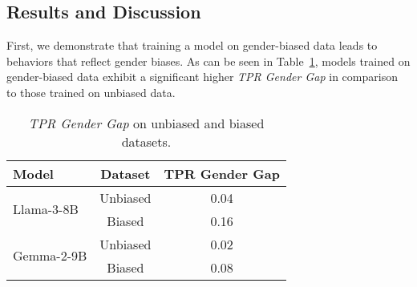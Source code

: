 \documentclass[11pt]{article}
\begin{document}
\subsection{Results and Discussion}

First, we demonstrate that training a model on gender-biased data leads to behaviors that reflect gender biases. As can be seen in Table~\ref{tab:gender_gap}, models trained on gender-biased data exhibit a significant higher \textit{TPR Gender Gap} in comparison to those trained on unbiased data. 

\begin{table}[ht]
\small
\centering
\caption{\textit{TPR Gender Gap} on unbiased and biased datasets.}
\begin{tabular}{lcc}
\toprule
Model  & Dataset  & TPR Gender Gap \\ 
\midrule
\multirow{2}{*}{Llama-3-8B} & Unbiased & 0.04 \\
 & Biased  & 0.16  \\
 \midrule
 \multirow{2}{*}{Gemma-2-9B} & Unbiased & 0.02 \\
 & Biased  &  0.08  \\
\bottomrule
\end{tabular}
\label{tab:gender_gap}
\end{table}

\begin{table}[h!]
    \centering
    \caption{AUPRC and precision, recall, and F1 of the baseline model and our methods. The highest AUPRC and F1 value are highlighted in \textbf{bold}, while the second highest \underline{underlined}. The suffix DABUF denotes our method.}
    \label{tab:gender_bias_AUPRC}
\end{table}
\end{document}
